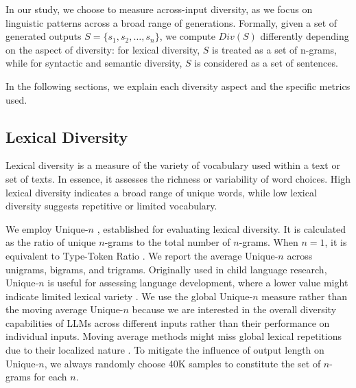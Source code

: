 \documentclass[11pt,a4paper]{article}
\begin{document}
In our study, we choose to measure across-input diversity, as we focus on linguistic patterns across a broad range of generations. Formally, given a set of generated outputs $S = \{s_1, s_2, \dots, s_n\}$, we compute $Div(S)$ differently depending on the aspect of diversity: for lexical diversity, $S$ is treated as a set of n-grams, while for syntactic and semantic diversity, $S$ is considered as a set of sentences.


In the following sections, we explain each diversity aspect and the specific metrics used.	


\subsection{Lexical Diversity}


Lexical diversity is a measure of the variety of vocabulary used within a text or set of texts. In essence, it assesses the richness or variability of word choices. High lexical diversity indicates a broad range of unique words, while low lexical diversity suggests repetitive or limited vocabulary.

We employ Unique-$n$ \citep{johnson1944studies, templin1957certain}, established for evaluating lexical diversity. It is calculated as the ratio of unique $n$-grams to the total number of $n$-grams. When $n=1$, it is equivalent to Type-Token Ratio \citep{johnson1944studies,templin1957certain}.
We report the average Unique-$n$ across unigrams, bigrams, and trigrams. Originally used in child language research, Unique-$n$ is useful for assessing language development, where a lower value might indicate limited lexical variety \citep{miller1981assessing}. We use the global Unique-$n$ measure rather than the moving average Unique-$n$ because we are interested in the overall diversity capabilities of LLMs across different inputs rather than their performance on individual inputs. Moving average methods might miss global lexical repetitions due to their localized nature \citep{bestgen2023measuring}. To mitigate the influence of output length on Unique-$n$, we always randomly choose 40K samples to constitute the set of $n$-grams for each $n$. %
\end{document}
